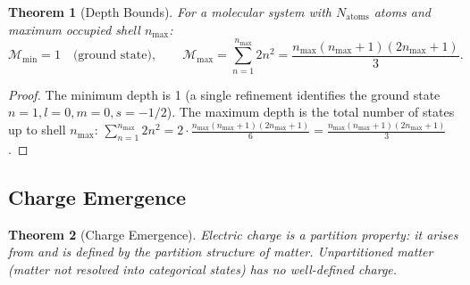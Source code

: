 \documentclass[11pt,twocolumn,a4paper]{article}
\newtheorem{theorem}{Theorem}[section]
\theoremstyle{definition}
\theoremstyle{remark}
\newcommand{\Depth}{\mathcal{M}}
\begin{document}
\begin{theorem}[Depth Bounds]
\label{thm:depth-bounds}
For a molecular system with $N_{\mathrm{atoms}}$ atoms and maximum occupied shell $n_{\max}$:
\[
  \Depth_{\min} = 1 \quad \text{(ground state)}, \qquad \Depth_{\max} = \sum_{n=1}^{n_{\max}} 2n^2 = \frac{n_{\max}(n_{\max}+1)(2n_{\max}+1)}{3}.
\]
\end{theorem}

\begin{proof}
The minimum depth is 1 (a single refinement identifies the ground state $n=1, l=0, m=0, s=-1/2$). The maximum depth is the total number of states up to shell $n_{\max}$: $\sum_{n=1}^{n_{\max}} 2n^2 = 2 \cdot \frac{n_{\max}(n_{\max}+1)(2n_{\max}+1)}{6} = \frac{n_{\max}(n_{\max}+1)(2n_{\max}+1)}{3}$.
\end{proof}

\subsection{Charge Emergence}
\label{sec:charge-emergence}

\begin{theorem}[Charge Emergence]
\label{thm:charge-emergence}
Electric charge is a partition property: it arises from and is defined by the partition structure of matter. Unpartitioned matter (matter not resolved into categorical states) has no well-defined charge.
\end{theorem}
\end{document}
